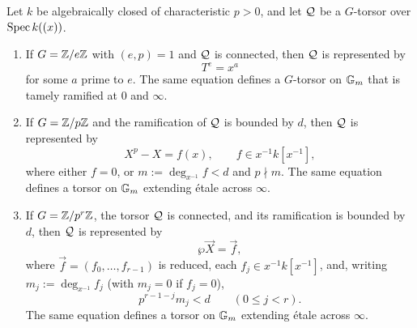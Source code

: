 \begin{lemma}
\label{lemma:realization_over_Gm}
\label{lemma:realization_over_Gm_Wr}
Let $k$ be algebraically closed of characteristic $p>0$, and let $\mathcal{Q}$ be a
$G$-torsor over $\operatorname{Spec} k((x))$.
\begin{enumerate}
    \item If $G=\mathbb{Z}/e\mathbb{Z}$ with $(e,p)=1$ and $\mathcal{Q}$ is connected, then
    $\mathcal{Q}$ is represented by
    \[
    T^e=x^a
    \]
    for some $a$ prime to $e$. The same equation defines a $G$-torsor
    on $\mathbb{G}_m$ that is tamely ramified at $0$ and $\infty$.

    \item If $G=\mathbb{Z}/p\mathbb{Z}$ and the ramification of $\mathcal{Q}$ is bounded by $d$,
    then $\mathcal{Q}$ is represented by
    \[
    X^p-X=f(x),\qquad f\in x^{-1}k[x^{-1}],
    \]
    where either $f=0$, or
    $m:=\deg_{x^{-1}}f<d$ and $p\nmid m$. The same equation defines a
    torsor on $\mathbb{G}_m$ extending \'etale across $\infty$.

    \item If $G=\mathbb{Z}/p^r\mathbb{Z}$, the torsor $\mathcal{Q}$ is connected, and its
    ramification is bounded by $d$, then $\mathcal{Q}$ is represented by
    \[
    \wp\vec X=\vec f,
    \]
    where $\vec f=(f_0,\dots,f_{r-1})$ is reduced, each
    $f_j\in x^{-1}k[x^{-1}]$, and, writing
    $m_j:=\deg_{x^{-1}}f_j$ (with $m_j=0$ if $f_j=0$),
    \begin{equation}\label{eq:parallel_witt_pole_bound}
    p^{r-1-j}m_j<d\qquad(0\leq j<r).
    \end{equation}
    The same equation defines a torsor on $\mathbb{G}_m$ extending \'etale across
    $\infty$.
\end{enumerate}
\end{lemma}

